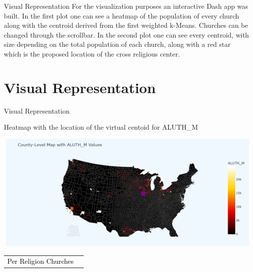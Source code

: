\documentclass[12pt]{beamer}
\begin{document}
\begin{frame}{Visual Representation}
 For the visualization purposes an interactive Dash app was built. In the first plot one can see a heatmap of the population of every church along with the centroid derived from the first weighted k-Means.
 Churches can be changed through the scrollbar. In the second plot one can see every centroid, with size depending on the total population of each church, along with a red star which is the proposed location of the cross religious center.



 
\end{frame}
\section{Visual Representation}
\begin{frame}{Visual Representation}


Heatmap with the location of the virtual centoid for ALUTH\_M
\begin{center}
    \includegraphics[width=0.8\linewidth, height=0.6\textheight, keepaspectratio]{C_level_map.png}
    
    \vspace{1em}
    \begin{tabular}{ll}
      \textcolor{black}{Per Religion Churches
 }\\

    \end{tabular}
\end{center}

\end{frame}
\end{document}
